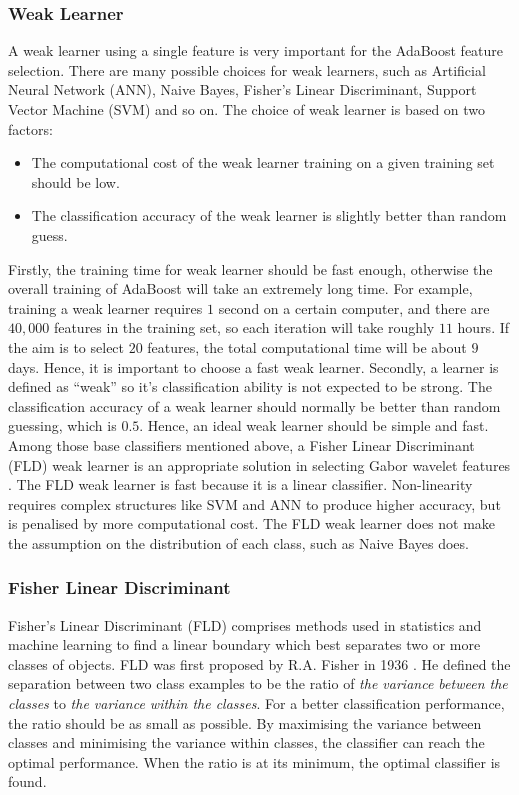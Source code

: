 \subsubsection{Weak Learner}
A weak learner using a single feature is very important for the AdaBoost feature selection. There are many possible choices for weak learners, such as Artificial Neural Network (ANN), Naive Bayes, Fisher's Linear Discriminant, Support Vector Machine (SVM) and so on. The choice of weak learner is based on two factors:
\begin{itemize}
 \item The computational cost of the weak learner training on a given training set should be low.
 \item The classification accuracy of the weak learner is slightly better than random guess.
\end{itemize}
Firstly, the training time for weak learner should be fast enough, otherwise the overall training of AdaBoost will take an extremely long time. For example, training a weak learner requires $1$ second on a certain computer, and there are $40,000$ features in the training set, so each iteration will take roughly $11$ hours. If the aim is to select $20$ features, the total computational time will be about $9$ days. Hence, it is important to choose a fast weak learner. Secondly, a learner is defined as ``weak'' so it's classification ability is not expected to be strong. The classification accuracy of a weak learner should normally be better than random guessing, which is $0.5$. Hence, an ideal weak learner should be simple and fast. Among those base classifiers mentioned above, a Fisher Linear Discriminant (FLD) weak learner is an appropriate solution in selecting Gabor wavelet features \cite{Ichikawa2006,Kong2006,Asami2005}. The FLD weak learner is fast because it is a linear classifier. Non-linearity requires complex structures like SVM and ANN to produce higher accuracy, but is penalised by more computational cost. The FLD weak learner does not make the assumption on the distribution of each class, such as Naive Bayes does.

\subsubsection{Fisher Linear Discriminant}
Fisher's Linear Discriminant (FLD) comprises methods used in statistics and machine learning to find a linear boundary which best separates two or more classes of objects. FLD was first proposed by R.A. Fisher in 1936 \cite{Fisher1936}. He defined the separation between two class examples to be the ratio of \textit{the variance between the classes} to \textit{the variance within the classes}. For a better classification performance, the ratio should be as small as possible. By maximising the variance between classes and minimising the variance within classes, the classifier can reach the optimal performance. When the ratio is at its minimum, the optimal classifier is found.

